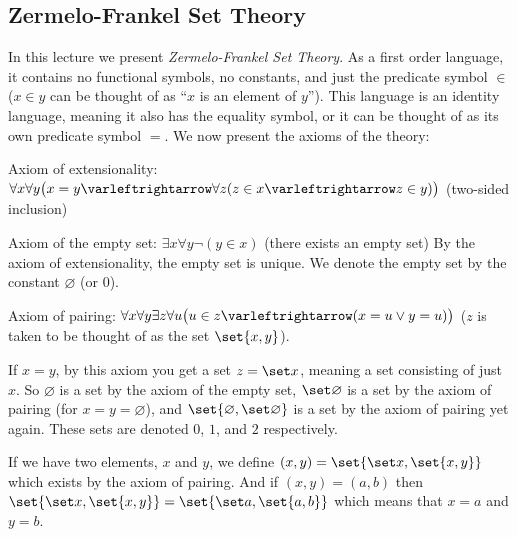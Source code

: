 \documentclass[10pt]{article}
\let\oto=\varleftrightarrow
\begin{document}


\bigskip

\subsection{Zermelo-Frankel Set Theory}

In this lecture we present \emph{Zermelo-Frankel Set Theory}.
As a first order language, it contains no functional symbols, no constants, and just the predicate symbol $\in$ ($x\in y$ can be thought of as ``$x$ is an element of $y$'').
This language is an identity language, meaning it also has the equality symbol, or it can be thought of as its own predicate symbol $=$.
We now present the axioms of the theory:

\benum
    \item Axiom of extensionality: $\forall x\forall y\bigl(x=y\oto\forall z(z\in x\oto z\in y)\bigr)$ (two-sided inclusion)

    \item Axiom of the empty set: $\exists x\forall y\neg(y\in x)$ (there exists an empty set)
    By the axiom of extensionality, the empty set is unique.
    We denote the empty set by the constant $\varnothing$ (or $0$).

    \item Axiom of pairing: $\forall x\forall y\exists z\forall u\bigl(u\in z\oto(x=u\lor y=u)\bigr)$ ($z$ is taken to be thought of as the set $\set{x,y}$).

    \btext If $x=y$, by this axiom you get a set $z=\set x$, meaning a set consisting of just $x$.
    So $\varnothing$ is a set by the axiom of the empty set, $\set\varnothing$ is a set by the axiom of pairing (for $x=y=\varnothing$), and $\set{\varnothing, \set\varnothing}$ is a set by the axiom of
    pairing yet again.
    These sets are denoted $0$, $1$, and $2$ respectively.

    If we have two elements, $x$ and $y$, we define $(x,y)=\set{\set x,\set{x,y}}$ which exists by the axiom of pairing.
    And if $(x,y)=(a,b)$ then $\set{\set x,\set{x,y}}=\set{\set a,\set{a,b}}$ which means that $x=a$ and $y=b$.
\end{document}
